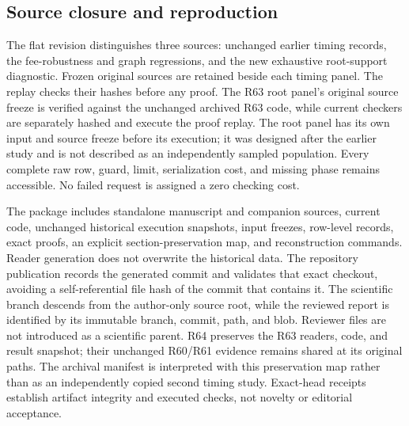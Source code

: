 \subsection{Source closure and reproduction}
The flat revision distinguishes three sources: unchanged earlier timing records, the fee-robustness and graph regressions, and the new exhaustive root-support diagnostic. Frozen original sources are retained beside each timing panel. The replay checks their hashes before any proof. The R63 root panel's original source freeze is verified against the unchanged archived R63 code, while current checkers are separately hashed and execute the proof replay. The root panel has its own input and source freeze before its execution; it was designed after the earlier study and is not described as an independently sampled population. Every complete raw row, guard, limit, serialization cost, and missing phase remains accessible. No failed request is assigned a zero checking cost.

The package includes standalone manuscript and companion sources, current code, unchanged historical execution snapshots, input freezes, row-level records, exact proofs, an explicit section-preservation map, and reconstruction commands. Reader generation does not overwrite the historical data. The repository publication records the generated commit and validates that exact checkout, avoiding a self-referential file hash of the commit that contains it. The scientific branch descends from the author-only source root, while the reviewed report is identified by its immutable branch, commit, path, and blob. Reviewer files are not introduced as a scientific parent. R64 preserves the R63 readers, code, and result snapshot; their unchanged R60/R61 evidence remains shared at its original paths. The archival manifest is interpreted with this preservation map rather than as an independently copied second timing study. Exact-head receipts establish artifact integrity and executed checks, not novelty or editorial acceptance.
